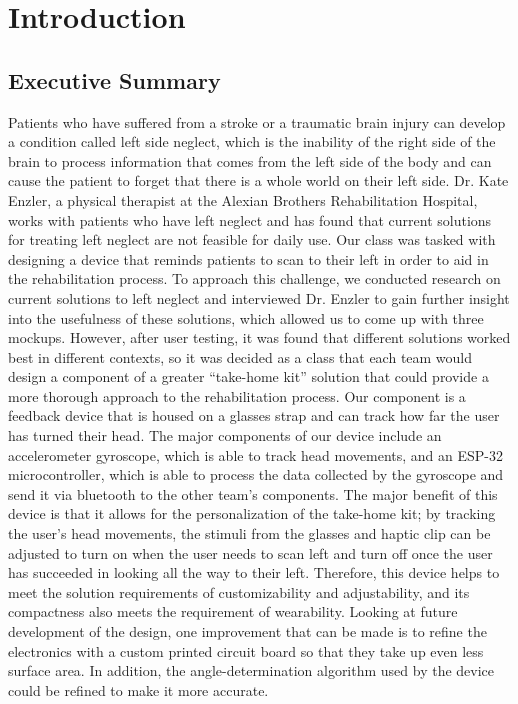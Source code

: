 \chapter{Introduction}
\label{chap:intro}

\section{Executive Summary}

Patients who have suffered from a stroke or a traumatic brain injury can develop
a condition called left side neglect, which is the inability of the right side
of the brain to process information that comes from the left side of the body
and can cause the patient to forget that there is a whole world on their left
side. Dr. Kate Enzler, a physical therapist at the Alexian Brothers
Rehabilitation Hospital, works with patients who have left neglect and has found
that current solutions for treating left neglect are not feasible for
daily use. Our class was tasked with designing a device that reminds
patients to scan to their left in order to aid in the rehabilitation process. To
approach this challenge, we conducted research on current solutions to left
neglect and interviewed Dr. Enzler to gain further insight into the usefulness
of these solutions, which allowed us to come up with three mockups. However,
after user testing, it was found that different solutions worked best in
different contexts, so it was decided as a class that each team would design a
component of a greater “take-home kit” solution that could provide a more
thorough approach to the rehabilitation process. Our component is a feedback
device that is housed on a glasses strap and can track how far the user has
turned their head. The major components of our device include an accelerometer
gyroscope, which is able to track head movements, and an ESP-32 microcontroller,
which is able to process the data collected by the gyroscope and send it via
bluetooth to the other team’s components. The major benefit of this device is
that it allows for the personalization of the take-home kit; by tracking the
user’s head movements, the stimuli from the glasses and haptic clip can be
adjusted to turn on when the user needs to scan left and turn off once the user
has succeeded in looking all the way to their left. Therefore, this device helps
to meet the solution requirements of customizability and adjustability, and its
compactness also meets the requirement of wearability. Looking at future
development of the design, one improvement that can be made is to refine the
electronics with a custom printed circuit board so that they take up even less
surface area. In addition, the angle-determination algorithm used by the device
could be refined to make it more accurate.

